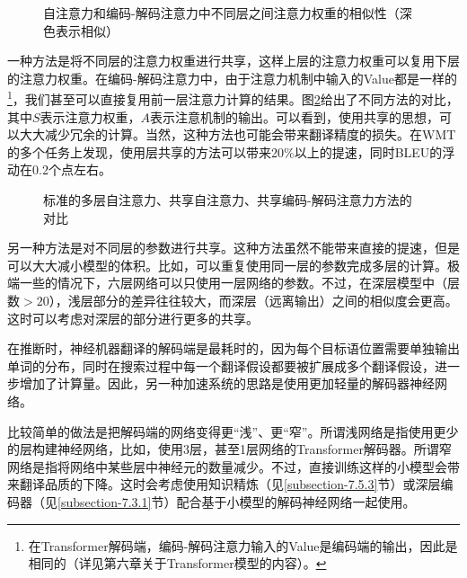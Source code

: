 \begin{figure}[htp]
\centering

\caption{自注意力和编码-解码注意力中不同层之间注意力权重的相似性（深色表示相似）}
\label{fig:7-21}
\end{figure}

\parinterval 一种方法是将不同层的注意力权重进行共享，这样上层的注意力权重可以复用下层的注意力权重。在编码-解码注意力中，由于注意力机制中输入的Value都是一样的 \footnote{在Transformer解码端，编码-解码注意力输入的Value是编码端的输出，因此是相同的（详见第六章关于Transformer模型的内容）。}，我们甚至可以直接复用前一层注意力计算的结果。图\ref{fig:7-22}给出了不同方法的对比，其中$S$表示注意力权重，$A$表示注意机制的输出。可以看到，使用共享的思想，可以大大减少冗余的计算。当然，这种方法也可能会带来翻译精度的损失。在WMT的多个任务上发现，使用层共享的方法可以带来20\%以上的提速，同时BLEU的浮动在0.2个点左右\cite{Xiao2019SharingAW}。

\begin{figure}[htp]
\centering

\caption{标准的多层自注意力、共享自注意力、共享编码-解码注意力方法的对比\cite{Xiao2019SharingAW}}
\label{fig:7-22}
\end{figure}

\parinterval 另一种方法是对不同层的参数进行共享。这种方法虽然不能带来直接的提速，但是可以大大减小模型的体积。比如，可以重复使用同一层的参数完成多层的计算。极端一些的情况下，六层网络可以只使用一层网络的参数\cite{DBLP:conf/aaai/DabreF19}。不过，在深层模型中（层数$>20$），浅层部分的差异往往较大，而深层（远离输出）之间的相似度会更高。这时可以考虑对深层的部分进行更多的共享。

\vspace{0.5em}
\vspace{0.5em}

\parinterval 在推断时，神经机器翻译的解码端是最耗时的，因为每个目标语位置需要单独输出单词的分布，同时在搜索过程中每一个翻译假设都要被扩展成多个翻译假设，进一步增加了计算量。因此，另一种加速系统的思路是使用更加轻量的解码器神经网络。

\parinterval 比较简单的做法是把解码端的网络变得更``浅''、更``窄''。所谓浅网络是指使用更少的层构建神经网络，比如，使用3层，甚至1层网络的Transformer解码器。所谓窄网络是指将网络中某些层中神经元的数量减少。不过，直接训练这样的小模型会带来翻译品质的下降。这时会考虑使用知识精炼（见\ref{subsection-7.5.3}节）或深层编码器（见\ref{subsection-7.3.1}节）配合基于小模型的解码神经网络一起使用。

